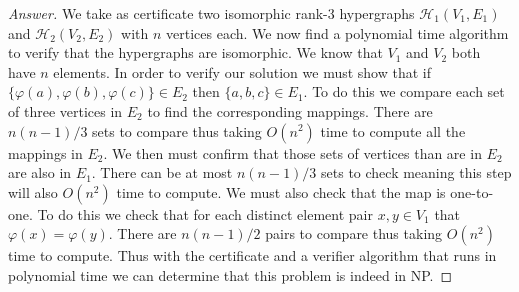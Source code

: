 \documentclass[11pt]{article}
\theoremstyle{definition}
\theoremstyle{definition}
\theoremstyle{definition}
\begin{document}
\begin{proof}[Answer]

We take as certificate two isomorphic rank-3 hypergraphs $\mathcal{H}_{1}(V_{1}, E_{1})$ and $\mathcal{H}_{2}(V_{2}, E_{2})$ with $n$ vertices each. We now find a polynomial time algorithm to verify that the hypergraphs are isomorphic.  We know that $ V_{1}$ and $V_{2}$ both have $n$ elements. In order to verify our solution we must show that if  $\{ \varphi(a), \varphi(b), \varphi(c) \} \in E_{2}$ then $\{a, b, c\} \in E_{1}$. To do this we compare each set of three vertices in $E_2$ to find the corresponding mappings. There are $n(n-1)/3$ sets to compare thus taking $O(n^2)$ time to compute all the mappings in $E_2$. We then must confirm that those sets of vertices than are in $E_2$ are also in $E_1$. There can be at most $n(n-1)/3$ sets to check meaning this step will also $O(n^2)$ time to compute. We must also check that the map is one-to-one. To do this we check that for each distinct element pair $x,y \in V_1$ that $\varphi(x) = \varphi(y)$. There are $n(n-1)/2$ pairs to compare thus taking $O(n^2)$ time to compute. Thus with the certificate and a verifier algorithm that runs in polynomial time we can determine that this problem is indeed in NP.
\end{proof}




\end{document}
